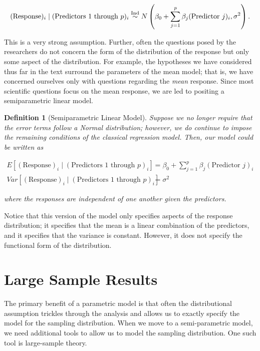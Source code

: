 \documentclass[
]{book}
\theoremstyle{plain}
\theoremstyle{mydefn}
\newtheorem{definition}{Definition}[chapter]
\theoremstyle{myexmpl}
\theoremstyle{remark}
\begin{document}
\[(\text{Response})_i \mid (\text{Predictors 1 through } p)_i \stackrel{\text{Ind}}{\sim} N\left(\beta_0 + \sum\limits_{j=1}^{p} \beta_j (\text{Predictor } j)_i, \sigma^2\right).\]

This is a very strong assumption. Further, often the questions posed by the researchers do not concern the form of the distribution of the response but only some aspect of the distribution. For example, the hypotheses we have considered thus far in the text surround the parameters of the mean model; that is, we have concerned ourselves only with questions regarding the \emph{mean} response. Since most scientific questions focus on the mean response, we are led to positing a semiparametric linear model.

\begin{definition}[Semiparametric Linear Model]
\protect\hypertarget{def:defn-semiparametric-linear-model}{}{\label{def:defn-semiparametric-linear-model} {} }Suppose we no longer require that the error terms follow a Normal distribution; however, we do continue to impose the remaining conditions of the classical regression model. Then, our model could be written as

\[
\begin{aligned}
  E\left[(\text{Response})_i \mid (\text{Predictors 1 through } p)_i\right]
    &= \beta_0 + \sum\limits_{j=1}^{p} \beta_j (\text{Predictor } j)_i \\
  Var\left[(\text{Response})_i \mid (\text{Predictors 1 through } p)_i\right]
    &= \sigma^2
\end{aligned}
\]

where the responses are independent of one another given the predictors.
\end{definition}

Notice that this version of the model only specifies aspects of the response distribution; it specifies that the mean is a linear combination of the predictors, and it specifies that the variance is constant. However, it does not specify the functional form of the distribution.

\hypertarget{large-sample-results}{%
\section{Large Sample Results}\label{large-sample-results}}

The primary benefit of a parametric model is that often the distributional assumption trickles through the analysis and allows us to exactly specify the model for the sampling distribution. When we move to a semi-parametric model, we need additional tools to allow us to model the sampling distribution. One such tool is large-sample theory.
\end{document}

